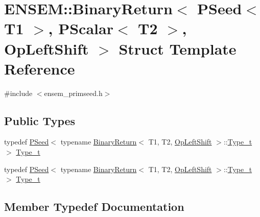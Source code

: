 \hypertarget{structENSEM_1_1BinaryReturn_3_01PSeed_3_01T1_01_4_00_01PScalar_3_01T2_01_4_00_01OpLeftShift_01_4}{}\section{E\+N\+S\+EM\+:\+:Binary\+Return$<$ P\+Seed$<$ T1 $>$, P\+Scalar$<$ T2 $>$, Op\+Left\+Shift $>$ Struct Template Reference}
\label{structENSEM_1_1BinaryReturn_3_01PSeed_3_01T1_01_4_00_01PScalar_3_01T2_01_4_00_01OpLeftShift_01_4}


{\ttfamily \#include $<$ensem\+\_\+primseed.\+h$>$}

\subsection*{Public Types}
\begin{DoxyCompactItemize}
\item 
typedef \mbox{\hyperlink{classENSEM_1_1PSeed}{P\+Seed}}$<$ typename \mbox{\hyperlink{structENSEM_1_1BinaryReturn}{Binary\+Return}}$<$ T1, T2, \mbox{\hyperlink{structENSEM_1_1OpLeftShift}{Op\+Left\+Shift}} $>$\+::\mbox{\hyperlink{structENSEM_1_1BinaryReturn_3_01PSeed_3_01T1_01_4_00_01PScalar_3_01T2_01_4_00_01OpLeftShift_01_4_a90ffce4c0c1de6cc5c4ee7ca839e1193}{Type\+\_\+t}} $>$ \mbox{\hyperlink{structENSEM_1_1BinaryReturn_3_01PSeed_3_01T1_01_4_00_01PScalar_3_01T2_01_4_00_01OpLeftShift_01_4_a90ffce4c0c1de6cc5c4ee7ca839e1193}{Type\+\_\+t}}
\item 
typedef \mbox{\hyperlink{classENSEM_1_1PSeed}{P\+Seed}}$<$ typename \mbox{\hyperlink{structENSEM_1_1BinaryReturn}{Binary\+Return}}$<$ T1, T2, \mbox{\hyperlink{structENSEM_1_1OpLeftShift}{Op\+Left\+Shift}} $>$\+::\mbox{\hyperlink{structENSEM_1_1BinaryReturn_3_01PSeed_3_01T1_01_4_00_01PScalar_3_01T2_01_4_00_01OpLeftShift_01_4_a90ffce4c0c1de6cc5c4ee7ca839e1193}{Type\+\_\+t}} $>$ \mbox{\hyperlink{structENSEM_1_1BinaryReturn_3_01PSeed_3_01T1_01_4_00_01PScalar_3_01T2_01_4_00_01OpLeftShift_01_4_a90ffce4c0c1de6cc5c4ee7ca839e1193}{Type\+\_\+t}}
\end{DoxyCompactItemize}


\subsection{Member Typedef Documentation}
\mbox{\label{structENSEM_1_1BinaryReturn_3_01PSeed_3_01T1_01_4_00_01PScalar_3_01T2_01_4_00_01OpLeftShift_01_4_a90ffce4c0c1de6cc5c4ee7ca839e1193}} 
